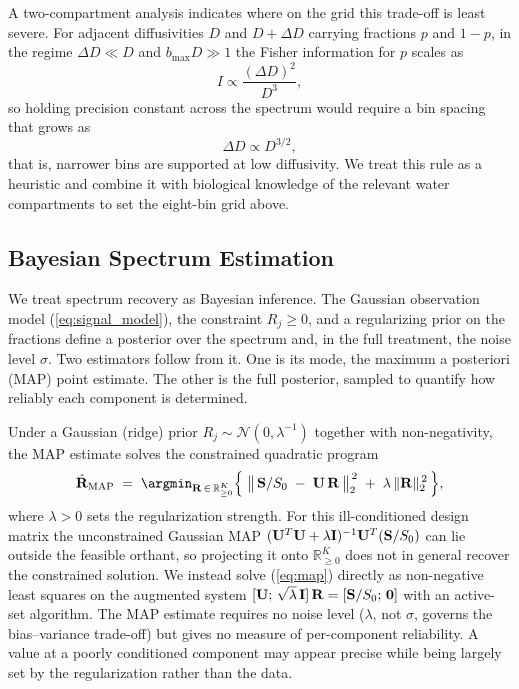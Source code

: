 A two-compartment analysis indicates where on the grid this trade-off is least severe. For adjacent diffusivities $D$ and $D + \Delta D$ carrying fractions $p$ and $1-p$, in the regime $\Delta D \ll D$ and $b_{\max} D \gg 1$ the Fisher information for $p$ scales as
%
\begin{equation}
  I \propto \frac{(\Delta D)^2}{D^3},
  \label{eq:fisher_scaling}
\end{equation}
%
so holding precision constant across the spectrum would require a bin spacing that grows as
%
\begin{equation}
  \Delta D \propto D^{3/2},
  \label{eq:spacing_scaling}
\end{equation}
%
that is, narrower bins are supported at low diffusivity. We treat this rule as a heuristic and combine it with biological knowledge of the relevant water compartments to set the eight-bin grid above.

\subsection{Bayesian Spectrum Estimation}

We treat spectrum recovery as Bayesian inference. The Gaussian observation model (\ref{eq:signal_model}), the constraint $R_j \geq 0$, and a regularizing prior on the fractions define a posterior over the spectrum and, in the full treatment, the noise level $\sigma$. Two estimators follow from it. One is its mode, the maximum a posteriori (MAP) point estimate. The other is the full posterior, sampled to quantify how reliably each component is determined.

Under a Gaussian (ridge) prior $R_j \sim \mathcal{N}(0, \lambda^{-1})$ together with non-negativity, the MAP estimate solves the constrained quadratic program
%
\begin{equation}
  \hat{\Rvec}_{\text{MAP}} \;=\; \argmin_{\Rvec \,\in\, \mathbb{R}_{\geq 0}^{K}}
  \Big\{\; \big\lVert\, \svec/S_0 \;-\; \Umat\,\Rvec\, \big\rVert_2^{\,2}
  \;+\; \lambda\, \lVert \Rvec \rVert_2^{\,2}\, \Big\},
  \label{eq:map}
\end{equation}
%
where $\lambda > 0$ sets the regularization strength.
For this ill-conditioned design matrix the unconstrained Gaussian MAP $(\mathbf{U}^{T}\mathbf{U} + \lambda \mathbf{I})^{-1}\mathbf{U}^{T}(\mathbf{S}/S_0)$ can lie outside the feasible orthant, so projecting it onto $\mathbb{R}_{\geq 0}^{K}$ does not in general recover the constrained solution. We instead solve (\ref{eq:map}) directly as non-negative least squares on the augmented system $[\mathbf{U};\, \sqrt{\lambda}\,\mathbf{I}]\,\mathbf{R} = [\mathbf{S}/S_0;\, \mathbf{0}]$ with an active-set algorithm.
The MAP estimate requires no noise level ($\lambda$, not $\sigma$, governs the bias--variance trade-off) but gives no measure of per-component reliability. A value at a poorly conditioned component may appear precise while being largely set by the regularization rather than the data.

